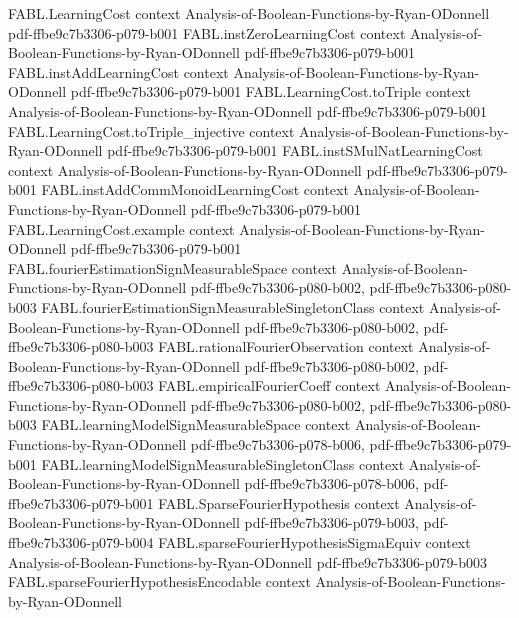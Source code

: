 \begin{theorem}
  {FABL.LearningCost}
  {context}
  {Analysis-of-Boolean-Functions-by-Ryan-ODonnell}
  {pdf-ffbe9c7b3306-p079-b001}
\proofstep
  {FABL.instZeroLearningCost}
  {context}
  {Analysis-of-Boolean-Functions-by-Ryan-ODonnell}
  {pdf-ffbe9c7b3306-p079-b001}
\proofstep
  {FABL.instAddLearningCost}
  {context}
  {Analysis-of-Boolean-Functions-by-Ryan-ODonnell}
  {pdf-ffbe9c7b3306-p079-b001}
\proofstep
  {FABL.LearningCost.toTriple}
  {context}
  {Analysis-of-Boolean-Functions-by-Ryan-ODonnell}
  {pdf-ffbe9c7b3306-p079-b001}
\proofstep
  {FABL.LearningCost.toTriple_injective}
  {context}
  {Analysis-of-Boolean-Functions-by-Ryan-ODonnell}
  {pdf-ffbe9c7b3306-p079-b001}
\proofstep
  {FABL.instSMulNatLearningCost}
  {context}
  {Analysis-of-Boolean-Functions-by-Ryan-ODonnell}
  {pdf-ffbe9c7b3306-p079-b001}
\proofstep
  {FABL.instAddCommMonoidLearningCost}
  {context}
  {Analysis-of-Boolean-Functions-by-Ryan-ODonnell}
  {pdf-ffbe9c7b3306-p079-b001}
\proofstep
  {FABL.LearningCost.example}
  {context}
  {Analysis-of-Boolean-Functions-by-Ryan-ODonnell}
  {pdf-ffbe9c7b3306-p079-b001}
\proofstep
  {FABL.fourierEstimationSignMeasurableSpace}
  {context}
  {Analysis-of-Boolean-Functions-by-Ryan-ODonnell}
  {pdf-ffbe9c7b3306-p080-b002,
    pdf-ffbe9c7b3306-p080-b003}
\proofstep
  {FABL.fourierEstimationSignMeasurableSingletonClass}
  {context}
  {Analysis-of-Boolean-Functions-by-Ryan-ODonnell}
  {pdf-ffbe9c7b3306-p080-b002,
    pdf-ffbe9c7b3306-p080-b003}
\proofstep
  {FABL.rationalFourierObservation}
  {context}
  {Analysis-of-Boolean-Functions-by-Ryan-ODonnell}
  {pdf-ffbe9c7b3306-p080-b002,
    pdf-ffbe9c7b3306-p080-b003}
\proofstep
  {FABL.empiricalFourierCoeff}
  {context}
  {Analysis-of-Boolean-Functions-by-Ryan-ODonnell}
  {pdf-ffbe9c7b3306-p080-b002,
    pdf-ffbe9c7b3306-p080-b003}
\proofstep
  {FABL.learningModelSignMeasurableSpace}
  {context}
  {Analysis-of-Boolean-Functions-by-Ryan-ODonnell}
  {pdf-ffbe9c7b3306-p078-b006,
    pdf-ffbe9c7b3306-p079-b001}
\proofstep
  {FABL.learningModelSignMeasurableSingletonClass}
  {context}
  {Analysis-of-Boolean-Functions-by-Ryan-ODonnell}
  {pdf-ffbe9c7b3306-p078-b006,
    pdf-ffbe9c7b3306-p079-b001}
\proofstep
  {FABL.SparseFourierHypothesis}
  {context}
  {Analysis-of-Boolean-Functions-by-Ryan-ODonnell}
  {pdf-ffbe9c7b3306-p079-b003,
    pdf-ffbe9c7b3306-p079-b004}
\proofstep
  {FABL.sparseFourierHypothesisSigmaEquiv}
  {context}
  {Analysis-of-Boolean-Functions-by-Ryan-ODonnell}
  {pdf-ffbe9c7b3306-p079-b003}
\proofstep
  {FABL.sparseFourierHypothesisEncodable}
  {context}
  {Analysis-of-Boolean-Functions-by-Ryan-ODonnell}

\end{theorem}
